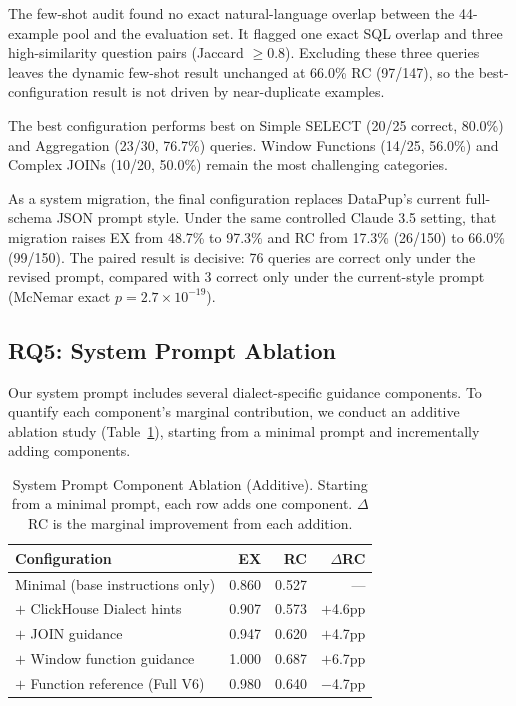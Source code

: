 \documentclass[sigconf, nonacm]{acmart}
\begin{document}
The few-shot audit found no exact natural-language overlap between the 44-example pool and the evaluation set. It flagged one exact SQL overlap and three high-similarity question pairs (Jaccard $\geq 0.8$). Excluding these three queries leaves the dynamic few-shot result unchanged at 66.0\% RC (97/147), so the best-configuration result is not driven by near-duplicate examples.

The best configuration performs best on Simple SELECT (20/25 correct, 80.0\%) and Aggregation (23/30, 76.7\%) queries. Window Functions (14/25, 56.0\%) and Complex JOINs (10/20, 50.0\%) remain the most challenging categories.

As a system migration, the final configuration replaces DataPup's current full-schema JSON prompt style. Under the same controlled Claude 3.5 setting, that migration raises EX from 48.7\% to 97.3\% and RC from 17.3\% (26/150) to 66.0\% (99/150). The paired result is decisive: 76 queries are correct only under the revised prompt, compared with 3 correct only under the current-style prompt (McNemar exact $p{=}2.7{\times}10^{-19}$).

\subsection{RQ5: System Prompt Ablation}
\label{sec:sysprompt}

Our system prompt includes several dialect-specific guidance components. To quantify each component's marginal contribution, we conduct an additive ablation study (Table~\ref{tab:sysprompt}), starting from a minimal prompt and incrementally adding components.

\begin{table}[t]
\caption{System Prompt Component Ablation (Additive). Starting from a minimal prompt, each row adds one component. $\Delta$RC is the marginal improvement from each addition.}
\label{tab:sysprompt}
\centering
\small
\begin{tabular}{lrrr}
\toprule
\textbf{Configuration} & \textbf{EX} & \textbf{RC} & \textbf{$\Delta$RC} \\
\midrule
Minimal (base instructions only) & 0.860 & 0.527 & --- \\
$+$ ClickHouse Dialect hints & 0.907 & 0.573 & $+$4.6pp \\
$+$ JOIN guidance & 0.947 & 0.620 & $+$4.7pp \\
$+$ Window function guidance & 1.000 & 0.687 & $+$6.7pp \\
$+$ Function reference (Full V6) & 0.980 & 0.640 & $-$4.7pp \\
\bottomrule
\end{tabular}
\end{table}
\end{document}
